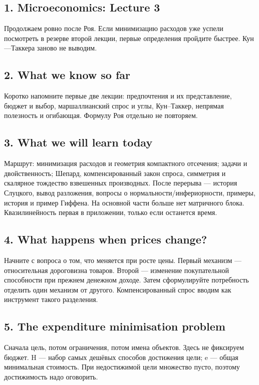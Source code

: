 \documentclass[11pt,a4paper]{article}
\begin{document}
\subsection*{1. Microeconomics: Lecture 3}
Продолжаем ровно после Роя. Если минимизацию расходов уже успели посмотреть в резерве второй лекции, первые определения пройдите быстрее. Кун—Таккера заново не выводим.

\subsection*{2. What we know so far}
Коротко напомните первые две лекции: предпочтения и их представление, бюджет и выбор, маршаллианский спрос и углы, Кун--Таккер, непрямая полезность и огибающая. Формулу Роя отдельно не повторяем.

\subsection*{3. What we will learn today}
Маршрут: минимизация расходов и геометрия компактного отсечения; задачи и двойственность; Шепард, компенсированный закон спроса, симметрия и скалярное тождество взвешенных производных. После перерыва — история Слуцкого, вывод разложения, вопросы о нормальности/инфериорности, примеры, история и пример Гиффена. На основной части больше нет матричного блока. Квазилинейность первая в приложении, только если останется время.

\subsection*{4. What happens when prices change?}
Начните с вопроса о том, что меняется при росте цены. Первый механизм — относительная дороговизна товаров. Второй — изменение покупательной способности при прежнем денежном доходе. Затем сформулируйте потребность отделить один механизм от другого. Компенсированный спрос вводим как инструмент такого разделения.

\subsection*{5. The expenditure minimisation problem}
Сначала цель, потом ограничения, потом имена объектов. Здесь не фиксируем бюджет. H — набор самых дешёвых способов достижения цели; e — общая минимальная стоимость. При недостижимой цели множество пусто, поэтому достижимость надо оговорить.
\end{document}
